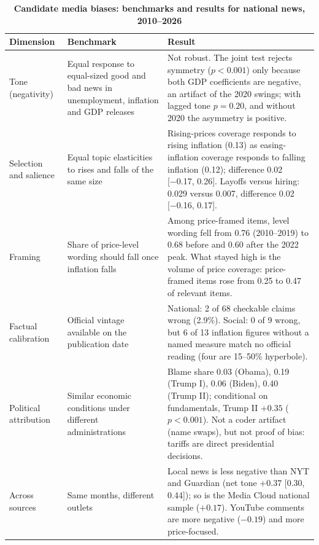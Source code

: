 \documentclass[11pt]{article}
\begin{document}
\begin{table}[htbp]
\centering
\begin{threeparttable}
\caption{\textbf{Candidate media biases: benchmarks and results for national news, 2010–2026}}
\label{tab:bias}
\footnotesize
\begin{tabularx}{\textwidth}{@{}>{\raggedright\arraybackslash}p{} >{\raggedright\arraybackslash}p{} X@{}}
\toprule
Dimension & Benchmark & Result\\
\midrule
Tone (negativity) & Equal response to equal-sized good and bad news in unemployment, inflation and GDP releases & Not robust. The joint test rejects symmetry ($p < 0.001$) only because both GDP coefficients are negative, an artifact of the 2020 swings; with lagged tone $p = 0.20$, and without 2020 the asymmetry is positive.\\
Selection and salience & Equal topic elasticities to rises and falls of the same size & Rising-prices coverage responds to rising inflation (0.13) as easing-inflation coverage responds to falling inflation (0.12); difference 0.02 [−0.17, 0.26]. Layoffs versus hiring: 0.029 versus 0.007, difference 0.02 [−0.16, 0.17].\\
Framing & Share of price-level wording should fall once inflation falls & Among price-framed items, level wording fell from 0.76 (2010–2019) to 0.68 before and 0.60 after the 2022 peak. What stayed high is the volume of price coverage: price-framed items rose from 0.25 to 0.47 of relevant items.\\
Factual calibration & Official vintage available on the publication date & National: 2 of 68 checkable claims wrong (2.9\%). Social: 0 of 9 wrong, but 6 of 13 inflation figures without a named measure match no official reading (four are 15–50\% hyperbole).\\
Political attribution & Similar economic conditions under different administrations & Blame share 0.03 (Obama), 0.19 (Trump I), 0.06 (Biden), 0.40 (Trump II); conditional on fundamentals, Trump II $+0.35$ ($p < 0.001$). Not a coder artifact (name swaps), but not proof of bias: tariffs are direct presidential decisions.\\
Across sources & Same months, different outlets & Local news is less negative than NYT and Guardian (net tone $+0.37$ [0.30, 0.44]); so is the Media Cloud national sample ($+0.17$). YouTube comments are more negative ($-0.19$) and more price-focused.\\
\bottomrule
\end{tabularx}

\end{threeparttable}
\end{table}
\end{document}
